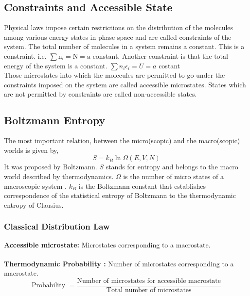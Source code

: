 \subsection{Constraints and Accessible State}
Physical laws impose certain restrictions on the distribution of the molecules among various energy states in phase space and are called constraints of the system. The total number of molecules in a system remains a constant. This is a constraint. i.e. $\sum \mathrm{n}_{\mathrm{i}}=\mathrm{N}=\mathrm{a}$ constant. Another constraint is that the total energy of the system is a constant. $\sum n_{i} \epsilon_{i}=U=a$ costant\\
 Those microstates into which the molecules are permitted to go under the constraints imposed on the system are called accessible microstates. States which are not permitted by constraints are called non-accessible states.
 \subsection{Boltzmann Entropy}
 The most important relation, between the micro(scopic) and the macro(scopic) worlds is given by,
\begin{equation}
 S=k_{B} \ln {\Omega}(E, V, N)
\end{equation}
 It was proposed by Boltzmann. $ S$ stands for entropy and belongs to the macro world described by thermodynamics. ${\Omega}$ is the number of micro states of a macroscopic system . $ k_{B}$ is the Boltzmann constant  that establishes correspondence of the statistical entropy of Boltzmann to the thermodynamic entropy of Clausius.
 \subsubsection{Classical Distribution Law }
 \textbf{Accessible microstate\qquad \quad: } Microstates corresponding to a macrostate.\\\\
 \textbf{Thermodynamic Probability : } Number of microstates corresponding to a macrostate.
 \begin{equation}
 \text{Probability }=\frac{\text{Number of microstates for accessible macrostate}}{\text{Total number of microstates}}
 \end{equation}

